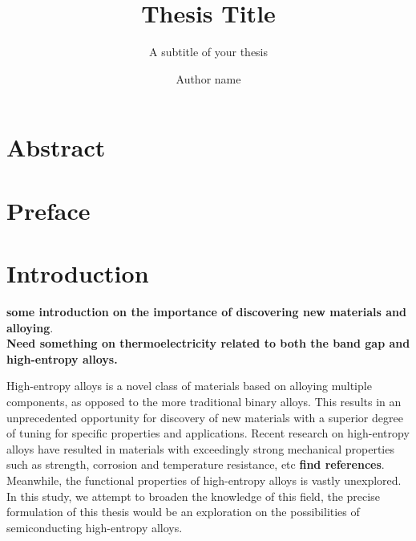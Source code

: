 \documentclass[UKenglish]{ifimaster}  %
\title{Thesis Title}        %
\subtitle{A subtitle of your thesis }         %
\author{Author name}                      %
\begin{document}
\duoforside[dept={Department Name <change at main.tex>},   %
  program={Master's Program Name <change at main.tex>},  %
  long]                                        %

\frontmatter{}  
\chapter*{Abstract}                   %

\tableofcontents{}
\listoffigures{}
\listoftables{}

\chapter*{Preface}                    %

\mainmatter{}

\chapter{Introduction}                  %

\textbf{some introduction on the importance of discovering new materials and alloying}.\\
\textbf{Need something on thermoelectricity related to both the band gap and high-entropy alloys.}

High-entropy alloys is a novel class of materials based on alloying multiple components, as opposed to the more traditional binary alloys. This results in an unprecedented opportunity for discovery of new materials with a superior degree of tuning for specific properties and applications. Recent research on high-entropy alloys have resulted in materials with exceedingly strong mechanical properties such as strength, corrosion and temperature resistance, etc \textbf{find references}. Meanwhile, the functional properties of high-entropy alloys is vastly unexplored. In this study, we attempt to broaden the knowledge of this field, the precise formulation of this thesis would be an exploration on the possibilities of semiconducting high-entropy alloys. 
\end{document}
